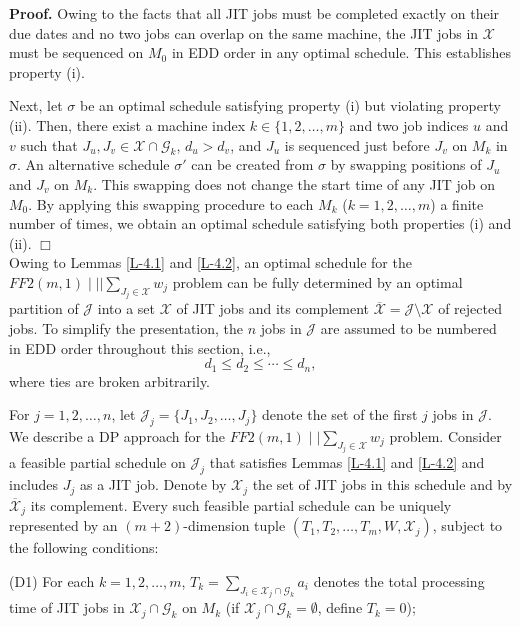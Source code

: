 \documentclass[12pt, eqno, limlimits]{article}
\begin{document}
\begin{sloppypar}
        \noindent \textbf{Proof.} Owing to the facts that all JIT jobs must be completed exactly on their due dates and no two jobs can overlap on the same machine, the JIT jobs in $\mathcal{X}$ must be sequenced on $M_0$ in EDD order in any optimal schedule. This establishes property (i).
        
        Next, let $\sigma$ be an optimal schedule satisfying property (i) but violating property (ii). Then, there exist a machine index $k \in \{1, 2, \ldots, m\}$ and two job indices $u$ and $v$ such that $J_u, J_v \in \mathcal{X} \cap \mathcal{G}_k$, $d_u > d_v$, and $J_u$ is sequenced just before $J_v$ on $M_k$ in $\sigma$. An alternative schedule $\sigma'$ can be created from
        $\sigma$ by swapping positions of $J_u$ and $J_v$ on $M_k$. This swapping does not change the start time of any JIT job on $M_0$. By applying this swapping procedure to each $M_k$ ($k=1, 2, \ldots, m$) a finite number of times, we obtain an optimal schedule satisfying both properties (i) and (ii). \hfill$\Box$\\ 
        
        Owing to Lemmas \ref{L-4.1} and \ref{L-4.2}, an optimal schedule for the $FF2(m, 1) \mid \mid |\sum_{J_j \in \mathcal{X}} w_j$ problem can be fully determined by an optimal partition of $\mathcal{J}$ into a set $\mathcal{X}$ of JIT jobs and its complement $\overline{\mathcal{X}}=\mathcal{J} \setminus \mathcal{X}$ of rejected jobs. To simplify the presentation, the $n$ jobs in $\mathcal{J}$ are assumed to be numbered in EDD order throughout this section, i.e.,
        \begin{equation}\label{Eq-4.3.1}
            d_1 \leq d_2 \leq \cdots \leq d_n,
        \end{equation}
        where ties are broken arbitrarily. 
        
        For $j=1, 2, \ldots, n$, let $\mathcal{J}_j=\{J_1, J_2, \ldots, J_j\}$ denote the set of the first $j$ jobs in  $\mathcal{J}$. We describe a DP approach for the $FF2(m, 1)\mid \mid \sum_{J_j \in \mathcal{X}} w_j$ problem. Consider a feasible partial schedule  on $\mathcal{J}_j$ that satisfies Lemmas \ref{L-4.1} and \ref{L-4.2} and includes $J_j$ as a JIT job. Denote by $\mathcal{X}_j$ the set of JIT jobs in this schedule and by $\overline{\mathcal{X}}_j$ its complement. Every such feasible partial schedule can be uniquely represented by an $(m+2)$-dimension tuple $(T_1, T_2, \ldots, T_m, W, \mathcal{X}_j)$, subject to the following conditions: 
        \begin{description}
            \item (D1) For each $k=1, 2, \ldots, m$, $T_k=\sum_{J_i \in \mathcal{X}_j \cap \mathcal{G}_k} a_i$ denotes the total processing time of JIT jobs in $\mathcal{X}_j \cap \mathcal{G}_k$ on $M_k$ (if $\mathcal{X}_j \cap \mathcal{G}_k=\emptyset$, define $T_k=0$);
            

\end{description}
\end{sloppypar}
\end{document}
